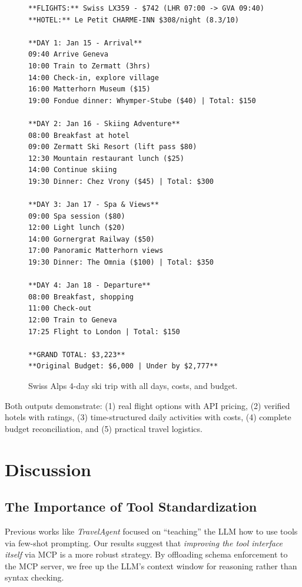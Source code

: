 \documentclass[10pt,twocolumn]{article}
\begin{document}
\begin{figure}[!htbp]
\scriptsize
\begin{verbatim}
**FLIGHTS:** Swiss LX359 - $742 (LHR 07:00 -> GVA 09:40)
**HOTEL:** Le Petit CHARME-INN $308/night (8.3/10)

**DAY 1: Jan 15 - Arrival**
09:40 Arrive Geneva
10:00 Train to Zermatt (3hrs)
14:00 Check-in, explore village
16:00 Matterhorn Museum ($15)
19:00 Fondue dinner: Whymper-Stube ($40) | Total: $150

**DAY 2: Jan 16 - Skiing Adventure**
08:00 Breakfast at hotel
09:00 Zermatt Ski Resort (lift pass $80)
12:30 Mountain restaurant lunch ($25)
14:00 Continue skiing
19:30 Dinner: Chez Vrony ($45) | Total: $300

**DAY 3: Jan 17 - Spa & Views**
09:00 Spa session ($80)
12:00 Light lunch ($20)
14:00 Gornergrat Railway ($50)
17:00 Panoramic Matterhorn views
19:30 Dinner: The Omnia ($100) | Total: $350

**DAY 4: Jan 18 - Departure**
08:00 Breakfast, shopping
11:00 Check-out
12:00 Train to Geneva
17:25 Flight to London | Total: $150

**GRAND TOTAL: $3,223**
**Original Budget: $6,000 | Under by $2,777**
\end{verbatim}
\caption{Swiss Alps 4-day ski trip with all days, costs, and budget.}
\label{fig:zermatt_output}
\end{figure}

Both outputs demonstrate: (1) real flight options with API pricing, (2) verified hotels with ratings, (3) time-structured daily activities with costs, (4) complete budget reconciliation, and (5) practical travel logistics.

\section{Discussion}

\subsection{The Importance of Tool Standardization}
Previous works like \textit{TravelAgent} focused on ``teaching'' the LLM how to use tools via few-shot prompting. Our results suggest that \textit{improving the tool interface itself} via MCP is a more robust strategy. By offloading schema enforcement to the MCP server, we free up the LLM's context window for reasoning rather than syntax checking.
\end{document}
